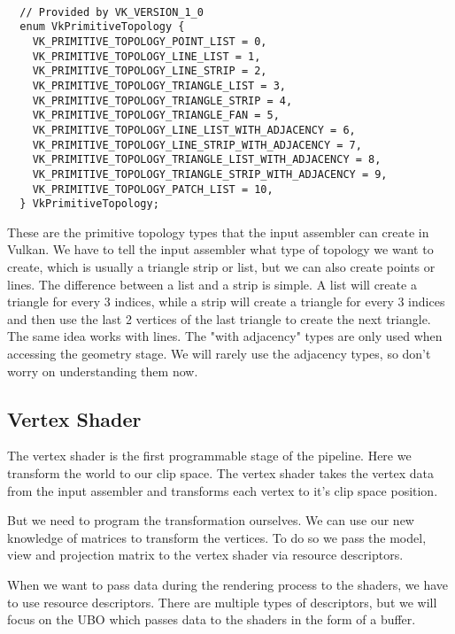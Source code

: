 \documentclass[12pt]{report} \usepackage{preamble}
\begin{document}
\newpage

\begin{lstlisting}[Language=C++] 

  // Provided by VK_VERSION_1_0
  enum VkPrimitiveTopology {
    VK_PRIMITIVE_TOPOLOGY_POINT_LIST = 0,
    VK_PRIMITIVE_TOPOLOGY_LINE_LIST = 1,
    VK_PRIMITIVE_TOPOLOGY_LINE_STRIP = 2,
    VK_PRIMITIVE_TOPOLOGY_TRIANGLE_LIST = 3,
    VK_PRIMITIVE_TOPOLOGY_TRIANGLE_STRIP = 4,
    VK_PRIMITIVE_TOPOLOGY_TRIANGLE_FAN = 5,
    VK_PRIMITIVE_TOPOLOGY_LINE_LIST_WITH_ADJACENCY = 6,
    VK_PRIMITIVE_TOPOLOGY_LINE_STRIP_WITH_ADJACENCY = 7,
    VK_PRIMITIVE_TOPOLOGY_TRIANGLE_LIST_WITH_ADJACENCY = 8,
    VK_PRIMITIVE_TOPOLOGY_TRIANGLE_STRIP_WITH_ADJACENCY = 9,
    VK_PRIMITIVE_TOPOLOGY_PATCH_LIST = 10,
  } VkPrimitiveTopology; 
  \end{lstlisting} \cite{vulkan-spec-primitive-topology}

These are the primitive topology types that the input assembler can
create in Vulkan.  We have to tell the input assembler what type of
topology we want to create, which is usually a triangle strip or list,
but we can also create points or lines.  The difference between a list
and a strip is simple. A list will create a triangle for every 3 indices,
while a strip will create a triangle for every 3 indices and then use
the last 2 vertices of the last triangle to create the next triangle.
The same idea works with lines. The "with adjacency" types are only
used when accessing the geometry stage. We will rarely use
the adjacency types, so don't worry on understanding them now. \cite{vulkan-spec-primitive-topology}

\subsection{Vertex Shader}

The vertex shader is the first programmable stage of the pipeline.
Here we transform the world to our clip space. The vertex shader takes
the vertex data from the input assembler and transforms each vertex
to it's clip space position. \cite{vulkan-tutorial-shader-modules}

But we need to program the transformation ourselves. We can use our new
knowledge of matrices to transform the vertices. To do so we pass the
model, view and projection matrix to the vertex shader via resource descriptors.

When we want to pass data during the rendering process to the shaders,
we have to use resource descriptors. There are multiple types of descriptors, but we will
focus on the \ac{UBO} which passes data to the shaders
in the form of a buffer.
\end{document}
